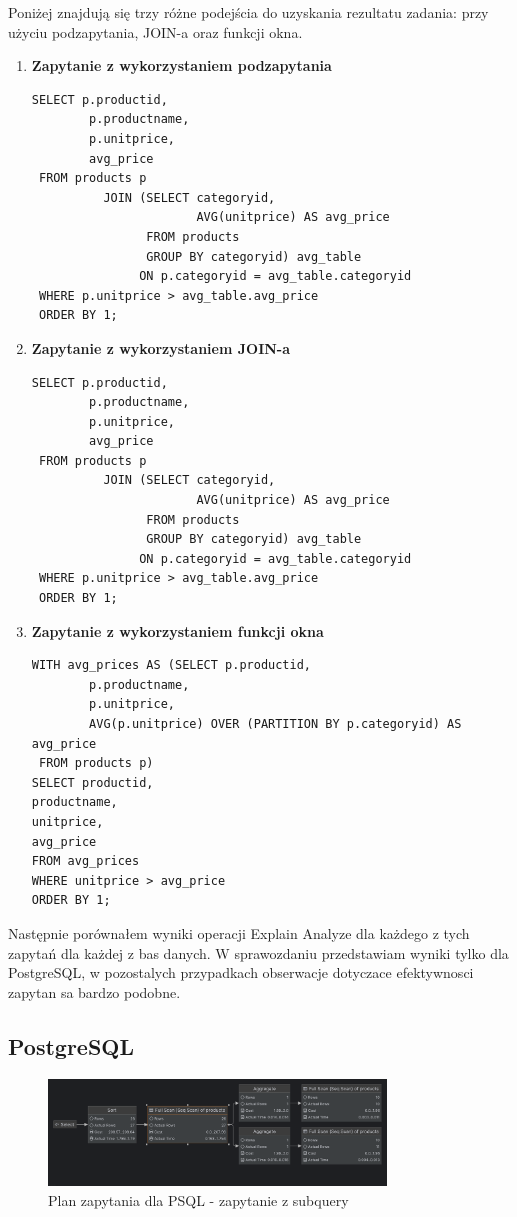 \documentclass{article}
\begin{document}
Poniżej znajdują się trzy różne podejścia do uzyskania rezultatu zadania: przy użyciu podzapytania, JOIN-a oraz funkcji okna.

\begin{enumerate}
    \item \textbf{Zapytanie z wykorzystaniem podzapytania}
    \begin{lstlisting}[caption={Subquery}]
        SELECT p.productid,
        p.productname,
        p.unitprice,
        avg_price
 FROM products p
          JOIN (SELECT categoryid,
                       AVG(unitprice) AS avg_price
                FROM products
                GROUP BY categoryid) avg_table
               ON p.categoryid = avg_table.categoryid
 WHERE p.unitprice > avg_table.avg_price
 ORDER BY 1;
    \end{lstlisting}

    \item \textbf{Zapytanie z wykorzystaniem JOIN-a}
    \begin{lstlisting}[caption={JOIN}]
        SELECT p.productid,
        p.productname,
        p.unitprice,
        avg_price
 FROM products p
          JOIN (SELECT categoryid,
                       AVG(unitprice) AS avg_price
                FROM products
                GROUP BY categoryid) avg_table
               ON p.categoryid = avg_table.categoryid
 WHERE p.unitprice > avg_table.avg_price
 ORDER BY 1;
    \end{lstlisting}

    \item \textbf{Zapytanie z wykorzystaniem funkcji okna}
    \begin{lstlisting}[caption={Funkcja okna}]
        WITH avg_prices AS (SELECT p.productid,
        p.productname,
        p.unitprice,
        AVG(p.unitprice) OVER (PARTITION BY p.categoryid) AS avg_price
 FROM products p)
SELECT productid,
productname,
unitprice,
avg_price
FROM avg_prices
WHERE unitprice > avg_price
ORDER BY 1;
    \end{lstlisting}
\end{enumerate}

Następnie porównałem wyniki operacji Explain Analyze dla każdego z tych zapytań dla każdej z bas danych.
W sprawozdaniu przedstawiam wyniki tylko dla PostgreSQL, w pozostalych przypadkach obserwacje dotyczace efektywnosci zapytan sa bardzo podobne.

\subsection*{PostgreSQL}
\begin{figure}[H]
    \centering
    \includegraphics[width=0.8\textwidth]{../images/psql_final_subquery_explain.png}
    \caption{Plan zapytania dla PSQL - zapytanie z subquery}
\end{figure}
\end{document}
